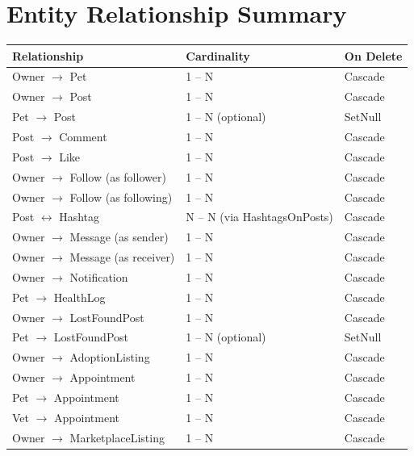 \documentclass[11pt,a4paper]{article}
\begin{document}
\section{Entity Relationship Summary}
\begin{longtable}{@{}p{4.2cm}p{3.4cm}p{5.8cm}@{}}
\toprule
\textbf{Relationship} & \textbf{Cardinality} & \textbf{On Delete} \\
\midrule
\endhead
Owner $\to$ Pet & 1 -- N & Cascade \\
Owner $\to$ Post & 1 -- N & Cascade \\
Pet $\to$ Post & 1 -- N (optional) & SetNull \\
Post $\to$ Comment & 1 -- N & Cascade \\
Post $\to$ Like & 1 -- N & Cascade \\
Owner $\to$ Follow (as follower) & 1 -- N & Cascade \\
Owner $\to$ Follow (as following) & 1 -- N & Cascade \\
Post $\leftrightarrow$ Hashtag & N -- N (via HashtagsOnPosts) & Cascade \\
Owner $\to$ Message (as sender) & 1 -- N & Cascade \\
Owner $\to$ Message (as receiver) & 1 -- N & Cascade \\
Owner $\to$ Notification & 1 -- N & Cascade \\
Pet $\to$ HealthLog & 1 -- N & Cascade \\
Owner $\to$ LostFoundPost & 1 -- N & Cascade \\
Pet $\to$ LostFoundPost & 1 -- N (optional) & SetNull \\
Owner $\to$ AdoptionListing & 1 -- N & Cascade \\
Owner $\to$ Appointment & 1 -- N & Cascade \\
Pet $\to$ Appointment & 1 -- N & Cascade \\
Vet $\to$ Appointment & 1 -- N & Cascade \\
Owner $\to$ MarketplaceListing & 1 -- N & Cascade \\
\bottomrule
\end{longtable}
\end{document}
